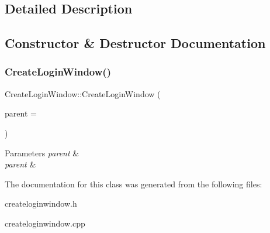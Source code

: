 \subsection{Detailed Description}

\begin{DoxyItemize}
\item 
\end{DoxyItemize}

\subsection{Constructor \& Destructor Documentation}
\mbox{\label{class_create_login_window_a5bddab7d05cb0e6b22dae4b96cc8ef13}} 
\subsubsection{\texorpdfstring{Create\+Login\+Window()}{CreateLoginWindow()}}
{\footnotesize\ttfamily Create\+Login\+Window\+::\+Create\+Login\+Window (\begin{DoxyParamCaption}\item[{Q\+Widget $\ast$}]{parent = {} }\end{DoxyParamCaption})\hspace{0.3cm}{\ttfamily [explicit]}}


\begin{DoxyItemize}
\item 
\begin{DoxyParams}{Parameters}
{\em parent} & \\
\hline
{\em parent} & \\
\hline
\end{DoxyParams}

\end{DoxyItemize}

The documentation for this class was generated from the following files\+:\begin{DoxyCompactItemize}
\item 
createloginwindow.\+h\item 
createloginwindow.\+cpp\end{DoxyCompactItemize}
